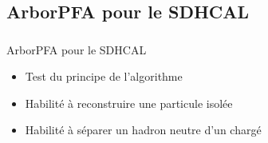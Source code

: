 \documentclass[8pt]{beamer}
\begin{document}
  \subsection{ArborPFA pour le SDHCAL}

  \begin{frame}
  \frametitle{\secname}
  \framesubtitle{\subsecname}

    \begin{block}{ArborPFA pour le SDHCAL}
      \begin{itemize}
        \item Test du principe de l'algorithme
        \item Habilité à reconstruire une particule isolée
        \item Habilité à séparer un hadron neutre d'un chargé
      \end{itemize}
    \end{block}


\end{frame}
\end{document}
